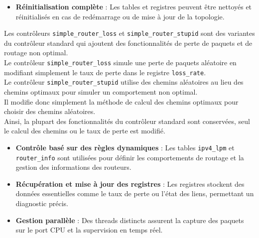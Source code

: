\documentclass[12pt,a4paper]{report}
\begin{document}
        \begin{card}[5. Réinitialisation]
        \begin{itemize}
            \item \textbf{Réinitialisation complète} : Les tables et registres peuvent être nettoyés et réinitialisés en cas de redémarrage ou de mise à jour de la topologie.
        \end{itemize}
        \end{card}
        
        \begin{card}
        Les contrôleurs \texttt{simple\_router\_loss} et \texttt{simple\_router\_stupid} sont des variantes du contrôleur standard qui ajoutent des fonctionnalités de perte de paquets et de routage non optimal. \\
        Le contrôleur \texttt{simple\_router\_loss} simule une perte de paquets aléatoire en modifiant simplement le taux de perte dans le registre \texttt{loss\_rate}. \\
        Le contrôleur \texttt{simple\_router\_stupid} utilise des chemins aléatoires au lieu des chemins optimaux pour simuler un comportement non optimal. \\
        Il modifie donc simplement la méthode de calcul des chemins optimaux pour choisir des chemins aléatoires. \\
        Ainsi, la plupart des fonctionnalités du contrôleur standard sont conservées, seul le calcul des chemins ou le taux de perte est modifié.
        \end{card}

        \begin{card}
        \begin{itemize}
            \item \textbf{Contrôle basé sur des règles dynamiques} : Les tables \texttt{ipv4\_lpm} et \texttt{router\_info} sont utilisées pour définir les comportements de routage et la gestion des informations des routeurs.
            \item \textbf{Récupération et mise à jour des registres} : Les registres stockent des données essentielles comme le taux de perte ou l'état des liens, permettant un diagnostic précis.
            \item \textbf{Gestion parallèle} : Des threads distincts assurent la capture des paquets sur le port CPU et la supervision en temps réel.
        \end{itemize}
        \end{card}
\end{document}
